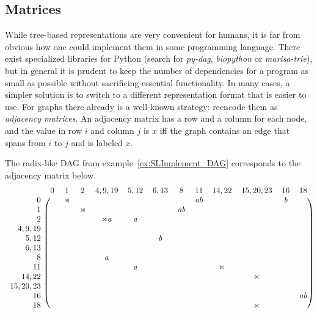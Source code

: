 \subsection{Matrices}

While tree-based representations are very convenient for humans, it is far from obvious how one could implement them in some programming language.
There exist specialized libraries for Python (search for \emph{py-dag}, \emph{biopython} or \emph{marisa-trie}), but in general it is prudent to keep the number of dependencies for a program as small as possible without sacrificing essential functionality.
In many cases, a simpler solution is to switch to a different representation format that is easier to use.
For graphs there already is a well-known strategy: reencode them as \emph{adjacency matrices}.
An adjacency matrix has a row and a column for each node, and the value in row $i$ and column $j$ is $x$ iff the graph contains an edge that spans from $i$ to $j$ and is labeled $x$.
%
\begin{examplebox}
    The radix-like DAG from example~\ref{ex:SLImplement_DAG} corresponds to the adjacency matrix below.
    \label{ex:SLImplement_AdjacencyMatrix}
    {
    \small
        \[
        \begin{blockarray}{rcccccccccccc}
            & 0 & 1 & 2 & 4,9,19 & 5,12 & 6,13 & 8 & 11 & 14,22 & 15,20,23 & 16 & 18\\ 
            \begin{block}{r(cccccccccccc)}
                0 & & \LeftEdge & & & & & & \String{ab} & & & \String{b}\\
                1 & & & \LeftEdge & & & & \String{ab}\\
                2 & & & & \String{\LeftEdge a} & \String{a}\\
                4,9,19 & \\
                5,12 & & & & & & \String{b}\\
                6,13 & \\
                8 & & & & \String{a}\\
                11 & & & & & \String{a} & & & & \String{\RightEdge}\\
                14,22 & & & & & & & & & & \String{\RightEdge}\\
                15,20,23 & \\
                16 & & & & & & & & & & & & \String{ab}\\
                18 & & & & & & & & & & \String{\RightEdge}\\
            \end{block}
        \end{blockarray}
        \]
    }
\end{examplebox}
